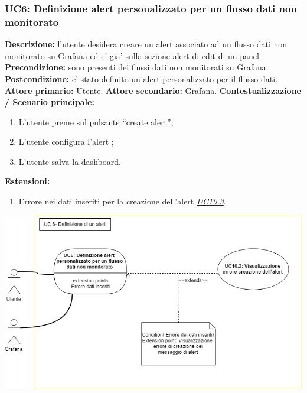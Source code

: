                 \subsubsection{UC6: Definizione alert personalizzato per un flusso dati non monitorato}
                    \textbf{Descrizione:} l’utente desidera creare un alert associato ad un flusso dati non monitorato su Grafana ed e’ gia’ sulla sezione alert di edit di un panel
                    \newline
                    \textbf{Precondizione:} sono presenti dei flussi dati non monitorati su Grafana.
                    \newline
                    \textbf{Postcondizione:} e’ stato definito un alert personalizzato per il flusso dati.
                    \newline
                    \textbf{Attore primario:} Utente.
                    \newline
                    \textbf{Attore secondario:} Grafana.
                    \newline
                    \textbf{Contestualizzazione / Scenario principale:} \begin{enumerate}
                            \item L’utente preme sul pulsante “create alert”;
                            \item L’utente configura l’alert ;
                            \item L’utente salva la dashboard.
                        \end{enumerate}
                    
                    \textbf{Estensioni:} 
                    \begin{enumerate}
                            \item Errore nei dati inseriti per la creazione dell'alert \underline{\textit{UC10.3}}.
                        \end{enumerate}
                
                \includegraphics[width=\textwidth]{UC6.png}
                
